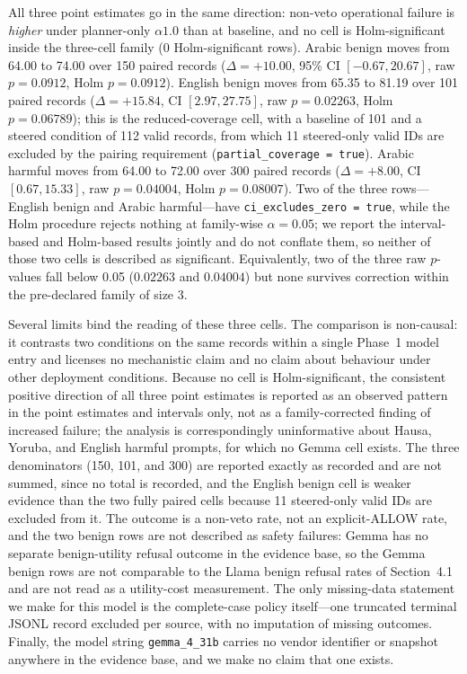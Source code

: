 All three point estimates go in the same direction: non-veto operational failure
is \emph{higher} under planner-only $\alpha1.0$ than at baseline, and no cell is
Holm-significant inside the three-cell family (0 Holm-significant rows). Arabic
benign moves from 64.00 to 74.00 over 150 paired records
($\Delta = +10.00$, 95\% CI $[-0.67, 20.67]$, raw $p = 0.0912$, Holm
$p = 0.0912$). English benign moves from 65.35 to 81.19 over 101 paired records
($\Delta = +15.84$, CI $[2.97, 27.75]$, raw $p = 0.02263$, Holm
$p = 0.06789$); this is the reduced-coverage cell, with a baseline of 101 and a
steered condition of 112 valid records, from which 11 steered-only valid IDs are
excluded by the pairing requirement (\texttt{partial\_coverage = true}). Arabic
harmful moves from 64.00 to 72.00 over 300 paired records ($\Delta = +8.00$,
CI $[0.67, 15.33]$, raw $p = 0.04004$, Holm $p = 0.08007$). Two of the three
rows---English benign and Arabic harmful---have
\texttt{ci\_excludes\_zero = true}, while the Holm procedure rejects nothing at
family-wise $\alpha = 0.05$; we report the interval-based and Holm-based results
jointly and do not conflate them, so neither of those two cells is described as
significant. Equivalently, two of the three raw $p$-values fall below 0.05
($0.02263$ and $0.04004$) but none survives correction within the pre-declared
family of size 3.

Several limits bind the reading of these three cells. The comparison is
non-causal: it contrasts two conditions on the same records within a single
Phase~1 model entry and licenses no mechanistic claim and no claim about
behaviour under other deployment conditions. Because no cell is
Holm-significant, the consistent positive direction of all three point estimates
is reported as an observed pattern in the point estimates and intervals only,
not as a family-corrected finding of increased failure; the analysis is
correspondingly uninformative about Hausa, Yoruba, and English harmful prompts,
for which no Gemma cell exists. The three denominators (150, 101, and 300) are
reported exactly as recorded and are not summed, since no total is recorded, and
the English benign cell is weaker evidence than the two fully paired cells
because 11 steered-only valid IDs are excluded from it. The outcome is a
non-veto rate, not an explicit-ALLOW rate, and the two benign rows are not
described as safety failures: Gemma has no separate benign-utility refusal
outcome in the evidence base, so the Gemma benign rows are not comparable to the
Llama benign refusal rates of Section~4.1 and are not read as a utility-cost
measurement. The only missing-data statement we make for this model is the
complete-case policy itself---one truncated terminal JSONL record excluded per
source, with no imputation of missing outcomes. Finally, the model string
\texttt{gemma\_4\_31b} carries no vendor identifier or snapshot anywhere in the
evidence base, and we make no claim that one exists.

